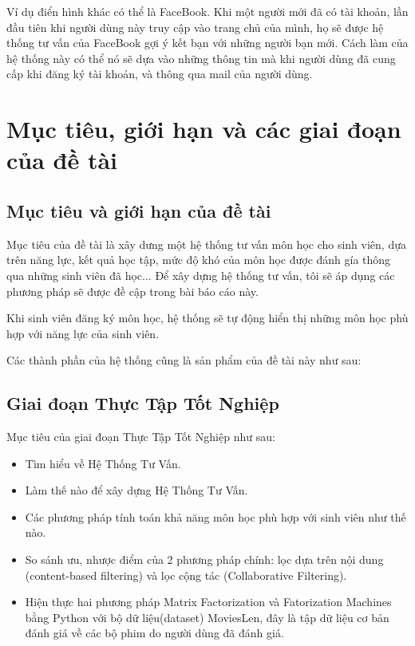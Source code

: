 \documentclass[a4paper,12pt,numbered,print,index,custombib, oneside, custommargin]{report}
\begin{document}
Ví dụ điển hình khác có thể là FaceBook. Khi một người mới đã có tài khoản, lần đầu tiên khi người dùng này truy cập vào trang chủ của mình, họ sẽ được hệ thống tư vấn của FaceBook gợi ý kết bạn với những người bạn mới. Cách làm của hệ thống này có thể nó sẽ dựa vào những thông tin mà khi người dùng đã cung cấp khi đăng ký tài khoản, và thông qua mail của người dùng.

\section{Mục tiêu, giới hạn và các giai đoạn của đề tài}
\subsection{Mục tiêu và giới hạn của đề tài}
Mục tiêu của đề tài là xây dưng một hệ thống tư vấn môn học cho sinh viên, dựa trên năng lực, kết quả học tập, mức độ khó của môn học được đánh gía thông qua những sinh viên đã học... Để xây dựng hệ thống tư vấn, tôi sẽ áp dụng các phương pháp sẽ được đề cập trong bài báo cáo này.

Khi sinh viên đăng ký môn học, hệ thống sẽ tự động hiển thị những môn học phù hợp với năng lực của sinh viên.

Các thành phần của hệ thống cũng là sản phẩm của đề tài này như sau:

\subsection{Giai đoạn Thực Tập Tốt Nghiệp}
Mục tiêu của giai đoạn Thực Tập Tốt Nghiệp như sau:
\begin{itemize}
\item Tìm hiểu về Hệ Thống Tư Vấn.
\item Làm thế nào để xây dựng Hệ Thống Tư Vấn.
\item Các phương pháp tính toán khả năng môn học phù hợp với sinh viên như thế nào.
\item So sánh ưu, nhược điểm của 2 phương pháp chính: lọc dựa trên nội dung (content-based filtering) và lọc cộng tác (Collaborative Filtering).
\item Hiện thực hai phương pháp Matrix Factorization và Fatorization Machines bằng Python với bộ dữ liệu(dataset) MoviesLen, đây là tập dữ liệu cơ bản đánh giá về các bộ phim do người dùng đã đánh giá.

\end{itemize}
\end{document}
